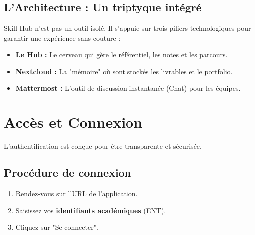 \documentclass[a4paper,12pt]{article}
\begin{document}
\subsection{L'Architecture : Un triptyque intégré}
Skill Hub n'est pas un outil isolé. Il s'appuie sur trois piliers technologiques pour garantir une expérience sans couture :

\begin{center}
\end{center}

\begin{itemize}
    \item \textbf{Le Hub :} Le cerveau qui gère le référentiel, les notes et les parcours.
    \item \textbf{Nextcloud :} La "mémoire" où sont stockés les livrables et le portfolio.
    \item \textbf{Mattermost :} L'outil de discussion instantanée (Chat) pour les équipes.
\end{itemize}

\newpage
\section{Accès et Connexion}

L'authentification est conçue pour être transparente et sécurisée.

\subsection*{Procédure de connexion}
\begin{enumerate}
    \item Rendez-vous sur l'URL de l'application.
    \item Saisissez vos \textbf{identifiants académiques} (ENT).
    \item Cliquez sur "Se connecter".
\end{enumerate}
\end{document}
